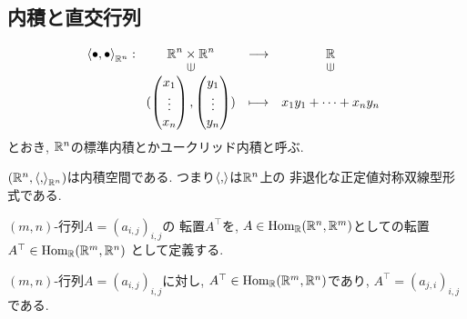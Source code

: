 \subsection{内積と直交行列}
\begin{align*}
  \Braket{\bullet,\bullet}_{\RR^n}\colon
  \Shazo{\RR^n \times \RR^n}{\RR}
        {(\begin{pmatrix}x_1\\\vdots\\x_n\end{pmatrix},\begin{pmatrix}y_1\\\vdots\\y_n\end{pmatrix})}
        {x_1y_1+\cdots+x_ny_n}
\end{align*}
とおき,
$\mathbb{R}^n$の標準内積とかユークリッド内積と呼ぶ.
\begin{prop}
  $(\mathbb{R}^n,\Braket{,}_{\mathbb{R}^n})$は内積空間である.
  つまり$\Braket{,}$は$\mathbb{R}^n$上の
  非退化な正定値対称双線型形式である.
\end{prop}
\begin{definition}
  $(m,n)$-行列$A=(a_{i,j})_{i,j}$の
  転置$A^\top$を,
  $A\in\operatorname{Hom}_{\mathbb{R}}(\mathbb{R}^n,\mathbb{R}^m)$としての転置$A^\top\in\operatorname{Hom}_{\mathbb{R}}(\mathbb{R}^m,\mathbb{R}^n)$
  として定義する.
\end{definition}
\begin{prop}
  $(m,n)$-行列$A=(a_{i,j})_{i,j}$に対し,
  $A^\top\in \operatorname{Hom}_{\mathbb{R}}(\mathbb{R}^m,\mathbb{R}^n)$であり,
  $A^\top=(a_{j,i})_{i,j}$である.
\end{prop}
